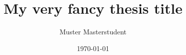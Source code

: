 \documentclass[
    ieee, %
    bachelor, %
    english, %
    singlepage %
]{ohm}
\title{My very fancy thesis title}
\author{Muster Masterstudent}
\date{\today}
\begin{document}
\frontmatter
\maketitle
\makeacknowledgements
\makeabstract
\maketableofcontents
\makeacronyms
\mainmatter






\listoffigures
\listoflistings
\listoftables
\makelexicon
\makebibliography
\appendix

\end{document}

